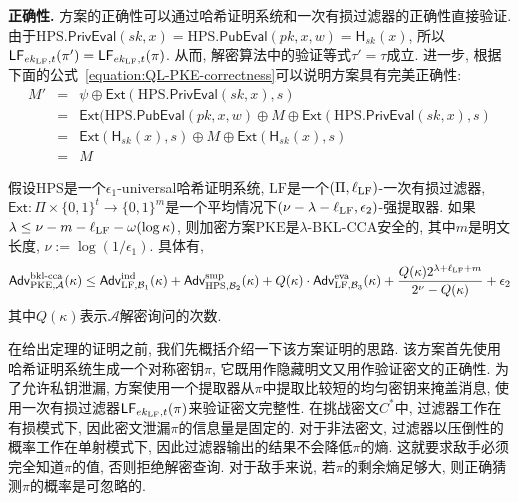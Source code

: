 \begin{trivlist}
\item \textbf{正确性.} 方案的正确性可以通过哈希证明系统和一次有损过滤器的正确性直接验证. 由于$\text{HPS}.\mathsf{PrivEval}(sk, x) =\text{HPS}.\mathsf{PubEval}(pk, x, w) = \mathsf{H}_{sk}(x)$, 所以$\mathsf{LF}_{ek_{\text{LF}}, t}(\pi') = \mathsf{LF}_{ek_{\text{LF}}, t}(\pi)$. 从而, 解密算法中的验证等式$\tau' = \tau$成立. 进一步, 根据下面的公式~\ref{equation:QL-PKE-correctness}可以说明方案具有完美正确性: 
\begin{eqnarray}\label{equation:QL-PKE-correctness}
	M' &=& \psi\oplus\mathsf{Ext}(\text{HPS}.\mathsf{PrivEval}(sk, x), s) \nonumber\\
        &=& \mathsf{Ext}(\text{HPS}.\mathsf{PubEval}(pk, x, w)\oplus M\oplus\mathsf{Ext}(\text{HPS}.\mathsf{PrivEval}(sk, x), s)\nonumber\\
        &=& \mathsf{Ext}(\mathsf{H}_{sk}(x), s)\oplus M\oplus\mathsf{Ext}(\mathsf{H}_{sk}(x), s)\nonumber\\
        &=& M
\end{eqnarray}
\end{trivlist}

\begin{theorem}\label{theorem:QL-PKE}
假设$\text{HPS}$是一个$\epsilon_1$-universal哈希证明系统, $\text{LF}$是一个$(\Pi,\ell_{\text{LF}})$-一次有损过滤器, $\mathsf{Ext}: \Pi \times \{0, 1\}^t \rightarrow \{0, 1\}^m$是一个平均情况下$(\nu-\lambda-\ell_{\text{LF}},\epsilon_2)$-强提取器. 如果$\lambda\leq \nu-m-\ell_{\text{LF}}-\omega(\log\kappa)$, 则加密方案$\text{PKE}$是$\lambda$-BKL-CCA安全的, 其中$m$是明文长度, $\nu := \log(1/\epsilon_1)$. 具体有,
\begin{displaymath}
\mathsf{Adv}_{\text{PKE},\mathcal{A}}^{\textup{bkl-cca}}(\kappa)\leq \mathsf{Adv}_{\text{LF},\mathcal{B}_1}^{\textup{ind}}(\kappa)+\mathsf{Adv}_{\text{HPS},\mathcal{B}_2}^{\textup{smp}}(\kappa)+Q(\kappa)\cdot\mathsf{Adv}_{\text{LF},\mathcal{B}_3}^{\textup{eva}}(\kappa)+\dfrac{Q(\kappa)2^{\lambda+\ell_{\text{LF}}+m}}{2^\nu-Q(\kappa)}+\epsilon_2
\end{displaymath}
其中$Q(\kappa)$表示$\mathcal{A}$解密询问的次数.
\end{theorem}

在给出定理的证明之前, 我们先概括介绍一下该方案证明的思路. 该方案首先使用哈希证明系统生成一个对称密钥$\pi$, 它既用作隐藏明文又用作验证密文的正确性. 为了允许私钥泄漏, 方案使用一个提取器从$\pi$中提取比较短的均匀密钥来掩盖消息, 使用一次有损过滤器$\mathsf{LF}_{ek_{\text{LF}},t}(\pi)$来验证密文完整性. 在挑战密文$C^*$中, 过滤器工作在有损模式下, 因此密文泄漏$\pi$的信息量是固定的. 对于非法密文, 过滤器以压倒性的概率工作在单射模式下, 因此过滤器输出的结果不会降低$\pi$的熵. 这就要求敌手必须完全知道$\pi$的值, 否则拒绝解密查询. 对于敌手来说, 若$\pi$的剩余熵足够大, 则正确猜测$\pi$的概率是可忽略的.

